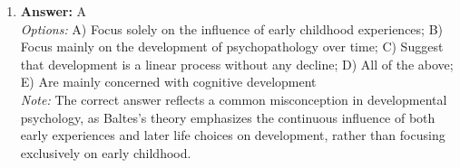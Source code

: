 \documentclass[12pt]{article}
\begin{document}
\begin{enumerate}[label=\arabic*.]
\\ \textit{Note:} Learned helplessness illustrates cognitive dissonance because it highlights the psychological conflict that arises when individuals perceive a lack of control over their environment, leading to a disconnect between their beliefs about personal agency and their experiences of failure.
\item \textbf{Answer:} A
\\ \textit{Options:} A) Focus solely on the influence of early childhood experiences; B) Focus mainly on the development of psychopathology over time; C) Suggest that development is a linear process without any decline; D) All of the above; E) Are mainly concerned with cognitive development
\\ \textit{Note:} The correct answer reflects a common misconception in developmental psychology, as Baltes's theory emphasizes the continuous influence of both early experiences and later life choices on development, rather than focusing exclusively on early childhood.
\end{enumerate}
\end{document}
